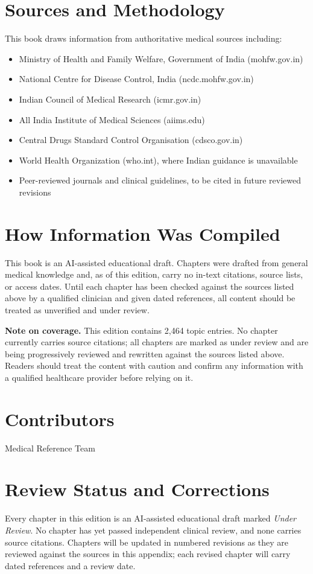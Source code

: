\documentclass[12pt,oneside]{book}
\begin{document}
\section*{Sources and Methodology}
This book draws information from authoritative medical sources including:
\begin{itemize}
  \item Ministry of Health and Family Welfare, Government of India (mohfw.gov.in)
  \item National Centre for Disease Control, India (ncdc.mohfw.gov.in)
  \item Indian Council of Medical Research (icmr.gov.in)
  \item All India Institute of Medical Sciences (aiims.edu)
  \item Central Drugs Standard Control Organisation (cdsco.gov.in)
  \item World Health Organization (who.int), where Indian guidance is unavailable
  \item Peer-reviewed journals and clinical guidelines, to be cited in future reviewed revisions
\end{itemize}

\section*{How Information Was Compiled}
This book is an AI-assisted educational draft. Chapters were drafted from general medical knowledge and, as of this edition, carry no in-text citations, source lists, or access dates. Until each chapter has been checked against the sources listed above by a qualified clinician and given dated references, all content should be treated as unverified and under review.

\medskip
\noindent\textbf{Note on coverage.} This edition contains 2,464 topic entries. No chapter currently carries source citations; all chapters are marked as under review and are being progressively reviewed and rewritten against the sources listed above. Readers should treat the content with caution and confirm any information with a qualified healthcare provider before relying on it.

\section*{Contributors}
Medical Reference Team

\section*{Review Status and Corrections}
Every chapter in this edition is an AI-assisted educational draft marked \emph{Under Review}. No chapter has yet passed independent clinical review, and none carries source citations. Chapters will be updated in numbered revisions as they are reviewed against the sources in this appendix; each revised chapter will carry dated references and a review date.
\end{document}
